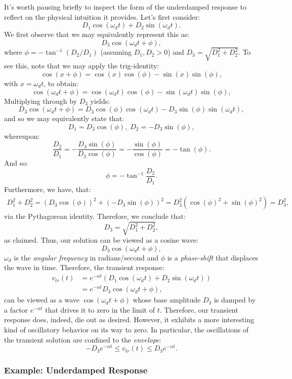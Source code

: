 \documentclass[twoside]{article}
\begin{document}
It's worth pausing briefly to inspect the form of the underdamped response to reflect on the physical intuition it provides. Let's first consider:
\[
    D_{1}\cos(\omega_{d}t) + D_{2}\sin(\omega_{d}t).
\]
We first observe that we may equivalently represent this as:
\[
    D_{3}\cos(\omega_{d}t + \phi),
\]
where $\phi = -\tan^{-1}(D_{2}/D_{1})$ (assuming $D_{1},D_{2} > 0$) and $D_{3} = \sqrt{D_{1}^{2} + D_{2}^{2}}$. To see this, note that we may apply the trig-identity:
\[
    \cos(x + \phi) = \cos(x)\cos(\phi) - \sin(x)\sin(\phi),
\]
with $x = \omega_{d}t$, to obtain:
\[
    \cos(\omega_{d}t + \phi) = \cos(\omega_{d}t)\cos(\phi) - \sin(\omega_{d}t)\sin(\phi),
\]
Multiplying through by $D_{3}$ yields:
\[
    D_{3}\cos(\omega_{d}t + \phi) = D_{3}\cos(\phi)\cos(\omega_{d}t) - D_{3}\sin(\phi)\sin(\omega_{d}t),
\]
and so we may equivalently state that:
\[
    D_{1} = D_{3}\cos(\phi),\;D_{2} = -D_{3}\sin(\phi),
\]
whereupon:
\[
    \frac{D_{2}}{D_{1}} = -\frac{D_{3}\sin(\phi)}{D_{3}\cos(\phi)} = -\frac{\sin(\phi)}{\cos(\phi)} = -\tan(\phi).
\]
And so:
\[
    \phi = -\tan^{-1} \frac{D_{2}}{D_{1}}.
\]
Furthermore, we have, that:
\begin{align*}
    D_{1}^{2} + D_{2}^{2} = (D_{3}\cos(\phi))^{2} + (-D_{3}\sin(\phi))^{2} = D_{3}^{2}(\cos(\phi)^{2} + \sin(\phi)^{2}) = D_{3}^{2},
\end{align*}
via the Pythagorean identity. Therefore, we conclude that:
\[
    D_{3} = \sqrt{D_{1}^{2} + D_{2}^{2}},
\]
as claimed. Thus, our solution can be viewed as a cosine wave:
\[
    D_{3}\cos(\omega_{d}t + \phi),
\]
$\omega_{d}$ is the \emph{angular frequency} in radians/second and $\phi$ is a \emph{phase-shift} that displaces the wave in time. Therefore, the transient response:
\begin{align*}
    v_{tr}(t) &= e^{-\alpha t}\left(D_{1}\cos(\omega_{d}t) + D_{2}\sin(\omega_{d}t)\right) \\
              &= e^{-\alpha t}D_{3}\cos(\omega_{d}t + \phi), 
\end{align*}
can be viewed as a wave $\cos(\omega_{d}t + \phi)$ whose base amplitude $D_{3}$ is damped by a factor $e^{-\alpha t}$ that drives it to zero in the limit of $t$. Therefore, our transient response does, indeed, die out as desired. However, it exhibits a more interesting kind of oscillatory behavior on its way to zero. In particular, the oscillations of the transient solution are confined to the \emph{envelope}:
\[
    -D_{3}e^{-\alpha t} \leq v_{tr}(t) \leq D_{3}e^{-\alpha t}.
\]

\subsubsection{Example: Underdamped Response}
\end{document}
